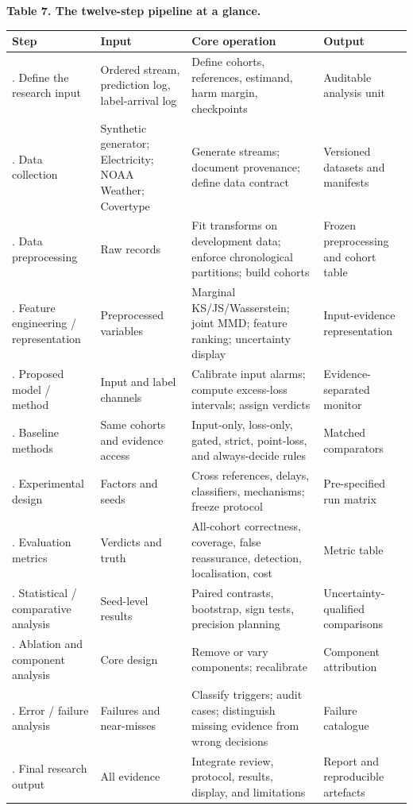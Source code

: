 \documentclass[
]{article}
\begin{document}
\textbf{Table 7. The twelve-step pipeline at a glance.}

\begin{longtable}[]{@{}
  >{\raggedright\arraybackslash}p{}
  >{\raggedright\arraybackslash}p{}
  >{\raggedright\arraybackslash}p{}
  >{\raggedright\arraybackslash}p{}@{}}
\toprule
Step & Input & Core operation & Output \\
\midrule
\endhead
1. Define the research input & Ordered stream, prediction log,
label-arrival log & Define cohorts, references, estimand, harm margin,
checkpoints & Auditable analysis unit \\
2. Data collection & Synthetic generator; Electricity; NOAA Weather;
Covertype & Generate streams; document provenance; define data contract
& Versioned datasets and manifests \\
3. Data preprocessing & Raw records & Fit transforms on development
data; enforce chronological partitions; build cohorts & Frozen
preprocessing and cohort table \\
4. Feature engineering / representation & Preprocessed variables &
Marginal KS/JS/Wasserstein; joint MMD; feature ranking; uncertainty
display & Input-evidence representation \\
5. Proposed model / method & Input and label channels & Calibrate input
alarms; compute excess-loss intervals; assign verdicts &
Evidence-separated monitor \\
6. Baseline methods & Same cohorts and evidence access & Input-only,
loss-only, gated, strict, point-loss, and always-decide rules & Matched
comparators \\
7. Experimental design & Factors and seeds & Cross references, delays,
classifiers, mechanisms; freeze protocol & Pre-specified run matrix \\
8. Evaluation metrics & Verdicts and truth & All-cohort correctness,
coverage, false reassurance, detection, localisation, cost & Metric
table \\
9. Statistical / comparative analysis & Seed-level results & Paired
contrasts, bootstrap, sign tests, precision planning &
Uncertainty-qualified comparisons \\
10. Ablation and component analysis & Core design & Remove or vary
components; recalibrate & Component attribution \\
11. Error / failure analysis & Failures and near-misses & Classify
triggers; audit cases; distinguish missing evidence from wrong decisions
& Failure catalogue \\
12. Final research output & All evidence & Integrate review, protocol,
results, display, and limitations & Report and reproducible artefacts \\
\bottomrule
\end{longtable}
\end{document}
